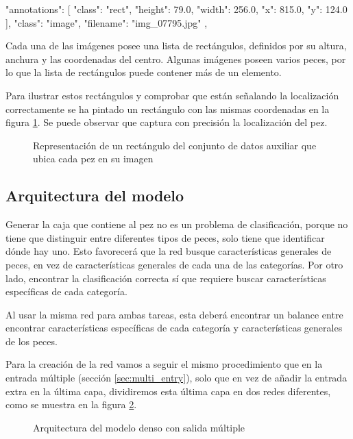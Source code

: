 \begin{python}
{
    "annotations": [
        {
            "class": "rect",
            "height": 79.0,
            "width": 256.0,
            "x": 815.0,
            "y": 124.0
        }
    ],
    "class": "image",
    "filename": "img_07795.jpg"
},
\end{python}

Cada una de las imágenes posee una lista de rectángulos, definidos por su
altura, anchura y las coordenadas del centro. Algunas imágenes poseen varios
peces, por lo que la lista de rectángulos puede contener más de un elemento.

Para ilustrar estos rectángulos y comprobar que están señalando la localización
correctamente se ha pintado un rectángulo con las mismas coordenadas en la
figura \ref{box}. Se puede observar que captura con precisión la localización
del pez.


\begin{figure}
  \caption{Representación de un rectángulo del conjunto de datos auxiliar que ubica cada pez en su imagen}
\label{box}
\end{figure}


\subsection{Arquitectura del modelo}

Generar la caja que contiene al pez no es un problema de clasificación, porque
no tiene que distinguir entre diferentes tipos de peces, solo tiene que
identificar dónde hay uno. Esto favorecerá que la red busque características
generales de peces, en vez de características generales de cada una de las
categorías. Por otro lado, encontrar la clasificación correcta sí que requiere
buscar características específicas de cada categoría.

Al usar la misma red para ambas tareas, esta deberá encontrar un balance entre
encontrar características específicas de cada categoría y características
generales de los peces.

Para la creación de la red vamos a seguir el mismo procedimiento que en la
entrada múltiple (sección \ref{sec:multi_entry}), solo que en vez de añadir la
entrada extra en la última capa, dividiremos esta última capa en dos redes
diferentes, como se muestra en la figura \ref{multi_output_arch}.

\begin{figure}
  \caption{Arquitectura del modelo denso con salida múltiple}
\label{multi_output_arch}
\end{figure}


